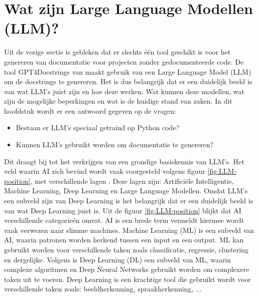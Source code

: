 \begin{table}[h!]
  \centering
  \caption{Overzicht van wat de tools kunnen genereren}
  \label{table:ra-tools}
  \end{table}

\section{Wat zijn Large Language Modellen (LLM)?}
\label{sec:wat-zijn-llms}

Uit de vorige sectie is gebleken dat er slechts één tool geschikt is voor het genereren van documentatie voor projecten zonder gedocumenteerde code. 
De tool GPT4Docstrings van \textcite{Trofficus2023} maakt gebruik van een Large Language Model (LLM) om de docstrings te genereren.
Het is dus belangrijk dat er een duidelijk beeld is van wat LLM's juist zijn en hoe deze werken.
Wat kunnen deze modellen, wat zijn de mogelijke beperkingen en wat is de huidige stand van zaken. 
In dit hoofdstuk wordt er een antwoord gegeven op de vragen: 
\begin{itemize}
  \item Bestaan er LLM's speciaal getraind op Python code? 
  \item Kunnen LLM's gebruikt worden om documentatie te genereren?
\end{itemize}

Dit draagt bij tot het verkrijgen van een grondige basiskennis van LLM's. 
Het veld waarin AI zich bevind wordt vaak voorgesteld volgens figuur \ref{fig:LLM-position}, met verschillende lagen \autocite{Stoeffelbauer2023}.
Deze lagen zijn: Artificiële Intelligentie, Machine Learning, Deep Learning en Large Language Modellen.
Omdat LLM's een subveld zijn van Deep Learning is het belangrijk dat er een duidelijk beeld is van wat Deep Learning juist is.
Uit de figuur \ref{fig:LLM-position} blijkt dat AI verschillende categorieën omvat.
AI is een brede term vermeldt \textcite{Stoeffelbauer2023} hiermee wordt vaak verwezen naar slimme machines. 
Machine Learning (ML) is een subveld van AI, waarin patronen worden herkend tussen een input en een output.
ML kan gebruikt worden voor verschillende taken zoals classificatie, regressie, clustering en dergelijke.
Volgens \textcite{Stoeffelbauer2023} is Deep Learning (DL) een subveld van ML, waarin complexe algoritmen en Deep Neural Networks gebruikt worden om complexere taken uit te voeren.
Deep Learning is een krachtige tool die gebruikt wordt voor verschillende taken zoals: beeldherkenning, spraakherkenning, ...

